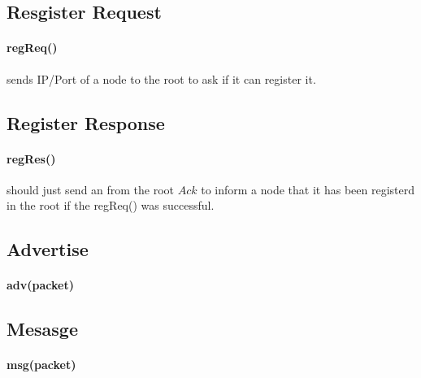 \documentclass{article}
\begin{document}
\subsection{Resgister Request}
\paragraph{regReq()} sends IP/Port of a node to the root to ask if it can register it. 
\subsection{Register Response}
\paragraph{regRes()} should just send an from the root $Ack$ to inform a node that it has been registerd in the root if the regReq() was successful.
\subsection{Advertise}
\paragraph{adv(packet)}
\subsection{Mesasge}
\paragraph{msg(packet)}
\clearpage
\end{document}
